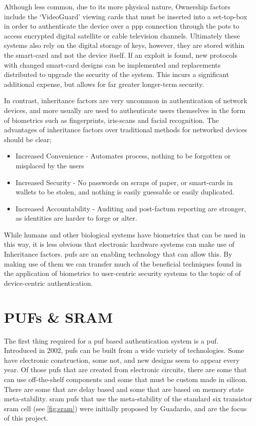 Although less common, due to its more physical nature, Ownership factors include the `VideoGuard'
viewing cards that must be inserted into a set-top-box in order to authenticate the device over
a \gls{ppp} connection through the \gls{pots} to access encrypted digital
satellite or cable television channels. Ultimately these systems also rely on
the digital storage of keys, however, they are stored
within the smart-card and not the device itself. If an exploit is found, new protocols with changed
smart-card designs can be implemented and replacements distributed to upgrade the security of the system.
This incurs a significant additional expense, but allows for far greater longer-term security.

In contrast, inheritance factors are very uncommon in authentication of network devices, and
more usually are used to authenticate users themselves in the form of biometrics such as fingerprints,
iris-scans and facial recognition.
The advantages of inheritance factors over traditional methods for networked devices should
be clear;
\begin{itemize}
\item Increased Convenience - Automates process, nothing to be forgotten or misplaced by the users
\item Increased Security - No passwords on scraps of paper, or smart-cards in wallets to be stolen,
  and nothing is easily guessable or easily duplicated.
\item Increased Accountability - Auditing and post-factum reporting are stronger, as identities are harder to forge or alter.
\end{itemize}

While humans and other biological systems have biometrics that can be used in this way, it is
less obvious that electronic hardware systems can make use of Inheritance factors.
\Glspl{puf} are an enabling technology that can allow this.
By making use of them we can transfer much of
the beneficial techniques found in the application of
biometrics to user-centric security systems to
the topic of of device-centric authentication.

\section{PUFs \& SRAM}

The first thing required for a \gls{puf} based authentication system is a \gls{puf}.
Introduced in 2002\cite{pappu2002puf},
\glspl{puf} can be built from a wide variety of technologies.
Some have
electronic construction, some not, and new designs seem to appear every year.
Of those \glspl{puf} that are created from electronic circuits, there are some
that can use off-the-shelf components and some that must be custom made in
silicon. There are some that are delay based\cite{maiti2010large} and some that
are based on memory state meta-stability.
\gls{sram} \glspl{puf} that use the meta-stability of the standard six transistor
\gls{sram} cell (see \autoref{fig:sram}) were initially proposed by
Guadardo\cite{guajardo2009puf}, and are the focus of this project.

